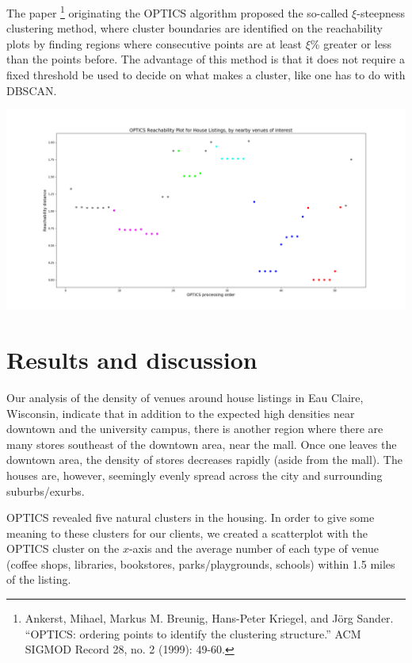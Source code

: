 \documentclass{article}
\begin{document}
The paper \footnote{Ankerst, Mihael, Markus M. Breunig, Hans-Peter Kriegel, and Jörg Sander. “OPTICS: ordering points to identify the clustering structure.” ACM SIGMOD Record 28, no. 2 (1999): 49-60.} originating the OPTICS algorithm proposed the so-called $\xi$-steepness clustering method, where cluster boundaries are identified on the reachability plots by finding regions where consecutive points are at least $\xi$\% greater or less than the points before. The advantage of this method is that it does not require a fixed threshold be used to decide on what makes a cluster, like one has to do with DBSCAN. 

\hspace{-2.5cm}\includegraphics[scale=0.43]{OPTICS_reachability_2.png}

\section{Results and discussion}

Our analysis of the density of venues around house listings in Eau Claire, Wisconsin, indicate that in addition to the expected high densities near downtown and the university campus, there is another region where there are many stores southeast of the downtown area, near the mall. Once one leaves the downtown area, the density of stores decreases rapidly (aside from the mall). The houses are, however, seemingly evenly spread across the city and surrounding suburbs/exurbs. 

OPTICS revealed five natural clusters in the housing. In order to give some meaning to these clusters for our clients, we created a scatterplot with the OPTICS cluster on the $x$-axis and the average number of each type of venue (coffee shops, libraries, bookstores, parks/playgrounds, schools) within 1.5 miles of the listing. 
\end{document}
